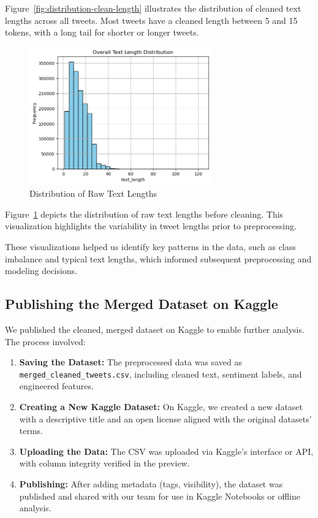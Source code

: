 Figure~\ref{fig:distribution-clean-length} illustrates the distribution of cleaned text lengths across all tweets. Most tweets have a cleaned length between 5 and 15 tokens, with a long tail for shorter or longer tweets.

\begin{figure}[H]
    \centering
    \includegraphics[width=0.7\textwidth]{img/dataset/distribution_text_length.png}
    \caption{Distribution of Raw Text Lengths}
    \label{fig:distribution-raw-length}
\end{figure}

Figure~\ref{fig:distribution-raw-length} depicts the distribution of raw text lengths before cleaning. This visualization highlights the variability in tweet lengths prior to preprocessing.

These visualizations helped us identify key patterns in the data, such as class imbalance and typical text lengths, which informed subsequent preprocessing and modeling decisions.

\subsection{Publishing the Merged Dataset on Kaggle}

We published the cleaned, merged dataset on Kaggle to enable further analysis. The process involved:

\begin{enumerate}
    \item \textbf{Saving the Dataset:} The preprocessed data was saved as \texttt{merged\_cleaned\_tweets.csv}, including cleaned text, sentiment labels, and engineered features.
    \item \textbf{Creating a New Kaggle Dataset:} On Kaggle, we created a new dataset with a descriptive title and an open license aligned with the original datasets’ terms.
    \item \textbf{Uploading the Data:} The CSV was uploaded via Kaggle’s interface or API, with column integrity verified in the preview.
    \item \textbf{Publishing:} After adding metadata (tags, visibility), the dataset was published and shared with our team for use in Kaggle Notebooks or offline analysis.
\end{enumerate}

